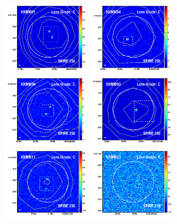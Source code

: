 \documentclass[iop]{emulateapj}
\begin{document}
\begin{figure}[!tbp]
\begin{centering}
\includegraphics[width=0.331\textwidth]{HXMM01_870_250.pdf}
\includegraphics[width=0.331\textwidth]{HXMM04_870_250.pdf}
\includegraphics[width=0.331\textwidth]{HXMM09_870_250.pdf}
\includegraphics[width=0.331\textwidth]{HXMM03_870_250.pdf}
\includegraphics[width=0.331\textwidth]{HXMM11_870_250.pdf}
\includegraphics[width=0.331\textwidth]{HXMM23_870_250.pdf}
\end{centering}


\end{figure}
\end{document}

